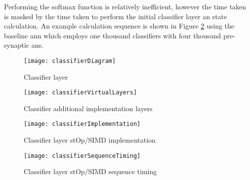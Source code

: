 Performing the softmax function is relatively inefficient, however the time taken is masked by the time taken to perform the initial classifier layer \ac{an} state calculation.
An example calculation sequence is shown in Figure \ref{fig:classifier implementation sequence timing} using the baseline \ac{ann} which employs one thousand classifiers with four thousand pre-synaptic \acp{an}.
\begin{figure}[h]
  \vspace{-5mm}
  \centering
  \captionsetup{justification=centering}
  \captionsetup{width=0.9\textwidth}
  \begin{minipage}{1\textwidth}
    \centering
    \centerline{
    \mbox{\texttt{[image: classifierDiagram]}}
    }
    \center\caption{Classifier layer}
    \label{fig:classifier layer}
  \end{minipage}
  \bigskip
  \vspace{-1mm}
  \begin{minipage}{1\textwidth}
    \centering
    \centerline{
    \mbox{\texttt{[image: classifierVirtualLayers]}}
    }
    \caption{Classifier additional implementation layers}
    \label{fig:classifier additional layers}
  \end{minipage}
\end{figure}

\begin{landscape}
  \centering
  \vspace*{\fill}
  \begin{figure}[h]
    \centering
    \captionsetup{justification=centering}
    \captionsetup{width=0.9\linewidth}
    \begin{minipage}{1\linewidth}
      \centering
      \centerline{
      \mbox{\texttt{[image: classifierImplementation]}}
      }
      \caption{Classifier layer stOp/SIMD implementation}
      \label{fig:classifier implementation}
    \end{minipage}
    \bigskip
    \vspace{1mm}
    \begin{minipage}{1\linewidth}
      \centering
      \centerline{
      \mbox{\texttt{[image: classifierSequenceTiming]}}
      }
      \caption{Classifier layer stOp/SIMD sequence timing}
      \label{fig:classifier implementation sequence timing}
    \end{minipage}
  \end{figure}
  \vfill
\end{landscape}

